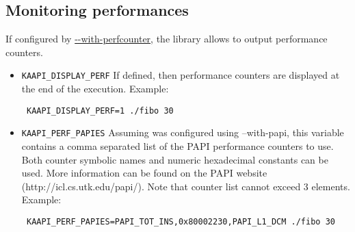 \subsection{Monitoring performances}
If configured by \url{--with-perfcounter}, the \kaapi library allows to
output performance counters.

\begin{itemize}
\item \verb+KAAPI_DISPLAY_PERF+\newline
If defined, then performance counters are displayed at the end of the execution.
Example:
\begin{verbatim}
 KAAPI_DISPLAY_PERF=1 ./fibo 30
\end{verbatim}

\item \verb+KAAPI_PERF_PAPIES+\newline
Assuming \kaapi was configured using --with-papi, this variable contains a
comma separated list of the PAPI performance counters to use.
Both counter symbolic names and numeric hexadecimal constants can be used.
More information can be found on the PAPI website
(http://icl.cs.utk.edu/papi/).
Note that counter list cannot exceed 3 elements.
Example:
\begin{verbatim}
 KAAPI_PERF_PAPIES=PAPI_TOT_INS,0x80002230,PAPI_L1_DCM ./fibo 30
\end{verbatim}

\end{itemize}
